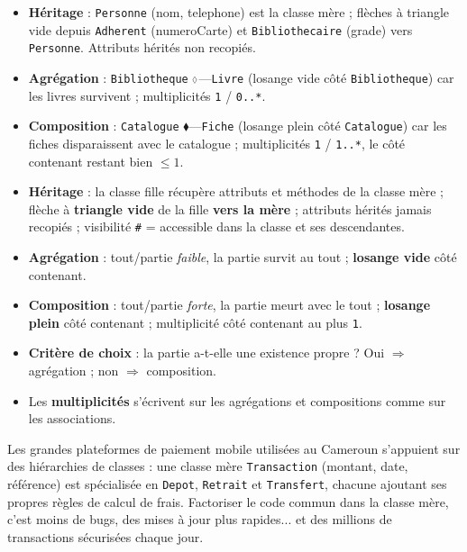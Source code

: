 \documentclass[11pt]{article}
\def\diamond{\mathbin{\scalebox{0.6}{$\Diamond$}}}%
\begin{document}
\begin{corrige}
\begin{itemize}
  \item \textbf{Héritage} : \texttt{Personne} (nom, telephone) est la classe mère ; flèches à triangle vide depuis \texttt{Adherent} (numeroCarte) et \texttt{Bibliothecaire} (grade) vers \texttt{Personne}. Attributs hérités non recopiés.
  \item \textbf{Agrégation} : \texttt{Bibliotheque} $\diamond$---\texttt{Livre} (losange vide côté \texttt{Bibliotheque}) car les livres survivent ; multiplicités \texttt{1} / \texttt{0..*}.
  \item \textbf{Composition} : \texttt{Catalogue} $\blacklozenge$---\texttt{Fiche} (losange plein côté \texttt{Catalogue}) car les fiches disparaissent avec le catalogue ; multiplicités \texttt{1} / \texttt{1..*}, le côté contenant restant bien $\leq 1$.
\end{itemize}
\end{corrige}

\begin{aretenir}
\begin{itemize}
  \item \textbf{Héritage} : la classe fille récupère attributs et méthodes de la classe mère ; flèche à \textbf{triangle vide} de la fille \textbf{vers la mère} ; attributs hérités jamais recopiés ; visibilité \texttt{\#} = accessible dans la classe et ses descendantes.
  \item \textbf{Agrégation} : tout/partie \emph{faible}, la partie survit au tout ; \textbf{losange vide} côté contenant.
  \item \textbf{Composition} : tout/partie \emph{forte}, la partie meurt avec le tout ; \textbf{losange plein} côté contenant ; multiplicité côté contenant au plus \texttt{1}.
  \item \textbf{Critère de choix} : la partie a-t-elle une existence propre ? Oui $\Rightarrow$ agrégation ; non $\Rightarrow$ composition.
  \item Les \textbf{multiplicités} s'écrivent sur les agrégations et compositions comme sur les associations.
\end{itemize}
\end{aretenir}

\begin{savaistu}
Les grandes plateformes de paiement mobile utilisées au Cameroun s'appuient sur des hiérarchies de classes : une classe mère \texttt{Transaction} (montant, date, référence) est spécialisée en \texttt{Depot}, \texttt{Retrait} et \texttt{Transfert}, chacune ajoutant ses propres règles de calcul de frais. Factoriser le code commun dans la classe mère, c'est moins de bugs, des mises à jour plus rapides... et des millions de transactions sécurisées chaque jour.
\end{savaistu}
\end{document}

